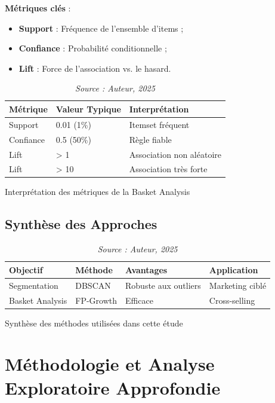 \documentclass[a4paper,12pt]{article}
\begin{document}
\textbf{Métriques clés} :
\begin{itemize}
    \item \textbf{Support} : Fréquence de l'ensemble d'items ;
    \item \textbf{Confiance} : Probabilité conditionnelle ;
    \item \textbf{Lift} : Force de l'association vs. le hasard.
\end{itemize}

\begin{table}[H]
\centering
\begin{tabular}{|l|p{4cm}|p{5cm}|}
\hline
\textbf{Métrique} & \textbf{Valeur Typique} & \textbf{Interprétation} \\
\hline
Support & 0.01 (1\%) & Itemset fréquent \\
\hline
Confiance & 0.5 (50\%) & Règle fiable \\
\hline
Lift & > 1 & Association non aléatoire \\
\hline
Lift & > 10 & Association très forte \\
\hline
\end{tabular}
\caption{Interprétation des métriques de la Basket Analysis}
\caption*{\textit{Source : Auteur, 2025}}
\label{tab:basket_metrics}
\end{table}

\section{Synthèse des Approches}
\begin{table}[H]
\centering
\begin{tabular}{|l|l|p{4cm}|p{4cm}|}
\hline
\textbf{Objectif} & \textbf{Méthode} & \textbf{Avantages} & \textbf{Application} \\
\hline
Segmentation & DBSCAN & Robuste aux outliers & Marketing ciblé \\
\hline
Basket Analysis & FP-Growth & Efficace & Cross-selling \\
\hline
\end{tabular}
\caption{Synthèse des méthodes utilisées dans cette étude}
\caption*{\textit{Source : Auteur, 2025}}
\label{tab:methodes_synthese}
\end{table}

\chapter{Méthodologie et Analyse Exploratoire Approfondie}
\end{document}
